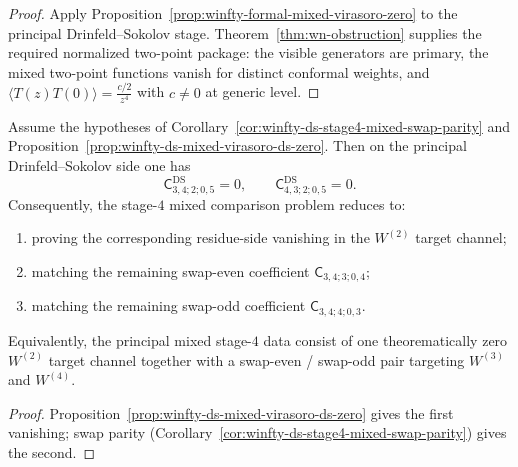 \begin{proof}
Apply Proposition~\ref{prop:winfty-formal-mixed-virasoro-zero} to the
principal Drinfeld--Sokolov stage.  Theorem~\ref{thm:wn-obstruction}
supplies the required normalized two-point package: the visible
generators are primary, the mixed two-point functions vanish for
distinct conformal weights, and
$\langle T(z)T(0)\rangle=\frac{c/2}{z^4}$ with $c\neq 0$ at generic
level.
\end{proof}

\begin{corollary}
\label{cor:winfty-ds-stage4-mixed-two-channel}
Assume the hypotheses of
Corollary~\ref{cor:winfty-ds-stage4-mixed-swap-parity} and
Proposition~\ref{prop:winfty-ds-mixed-virasoro-ds-zero}.  Then on the
principal Drinfeld--Sokolov side one has
\[
\mathsf{C}^{\mathrm{DS}}_{3,4;2;0,5}=0,
\qquad
\mathsf{C}^{\mathrm{DS}}_{4,3;2;0,5}=0.
\]
Consequently, the stage-$4$ mixed comparison problem reduces to:
\begin{enumerate}[label=\textup{(\roman*)}]
\item proving the corresponding residue-side vanishing in the
  $W^{(2)}$ target channel;
\item matching the remaining swap-even coefficient
  $\mathsf{C}_{3,4;3;0,4}$;
\item matching the remaining swap-odd coefficient
  $\mathsf{C}_{3,4;4;0,3}$.
\end{enumerate}
Equivalently, the principal mixed stage-$4$ data consist of one
theorematically zero $W^{(2)}$ target channel together with a
swap-even / swap-odd pair targeting $W^{(3)}$ and $W^{(4)}$.
\end{corollary}

\begin{proof}
Proposition~\ref{prop:winfty-ds-mixed-virasoro-ds-zero} gives the first vanishing; swap parity (Corollary~\ref{cor:winfty-ds-stage4-mixed-swap-parity}) gives the second.
\end{proof}

